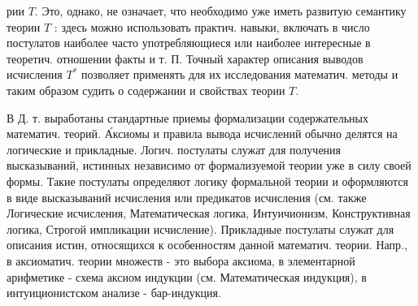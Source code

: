 \documentclass[10pt]{article}
\begin{document}
рии $T$. Это, однако, не означает, что необходимо уже иметь развитую семантику теории $T$ : здесь можно использовать практич. навыки, включать в число постулатов наиболее часто употребляющиеся или наиболее интересные в теоретич. отношении факты и т. П. Точный характер описания выводов исчисления $T^{*}$ позволяет применять для их исследования математич. методы и таким образом судить о содержании и свойствах теории $T$.



В Д. т. выработаны стандартные приемы формализации содержательных математич. теорий. А́ксиомы и правила вывода исчислений обычно делятся на логические и прикладные. Логич. постулаты служат для получения высказываний, истинных независимо от формализуемой теории уже в силу своей формы. Такие постулаты определяют логику формальной теории и оформляются в виде высказываний исчисления или предикатов исчисления (см. также Логические исчисления, Математическая логика, Интуичионизм, Конструктивная логика, Строгой импликации исчисление). Прикладные постулаты служат для описания истин, относящихся к особенностям данной математич. теории. Напр., в аксиоматич. теории множеств - это выбора аксиома, в элементарной арифметике - схема аксиом индукции (см. Математическая индукция), в интуиционистском анализе - бар-индукция.
\end{document}
